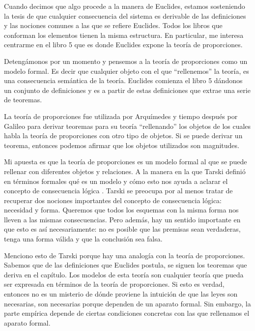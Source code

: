 Cuando decimos que algo procede a la manera de Euclides, estamos sosteniendo la tesis de que cualquier consecuencia del sistema es derivable de las definiciones y las nociones comunes a las que se refiere Euclides. Todos los libros que conforman los elementos tienen la misma estructura. En particular, me interesa centrarme en el libro 5 que es donde Euclides expone la teoría de proporciones.

Detengámonos por un momento y pensemos a la teoría de proporciones como un modelo formal. Es decir que cualquier objeto con el que ``rellenemos'' la teoría, es una consecuencia semántica%
de la teoría. Euclides comienza el libro 5 dándonos un conjunto de definiciones y es a partir de estas definiciones que extrae una serie de teoremas.

La teoría de proporciones fue utilizada por Arquímedes y tiempo después por Galileo para derivar teoremas para su teoría ``rellenando'' los objetos de los cuales habla la teoría de proporciones con otro tipo de objetos. Si se puede derivar un teorema, entonces podemos afirmar que los objetos utilizados son magnitudes.

Mi apuesta es que la teoría de proporciones es un modelo formal al que se puede rellenar con diferentes objetos y relaciones. A la manera en la que Tarski definió en términos formales qué es un modelo y cómo esto nos ayuda a aclarar el concepto de consecuencia lógica \cite{Tarski1956}. Tarski se preocupa por al menos tratar de recuperar dos nociones importantes del concepto de consecuencia lógica: necesidad y forma. \cite{Torrente2000} Queremos que todos los esquemas con la misma forma nos lleven a las mismas consecuencias. Pero además, hay un sentido importante en que esto es así necesariamente: no es posible que las premisas sean verdaderas, tenga una forma válida y que la conclusión sea falsa.

Menciono esto de Tarski porque hay una analogía con la teoría de proporciones. Sabemos que de las definiciones que Euclides postula, se siguen los teoremas que deriva en el capítulo. Los modelos de esta teoría son cualquier teoría que pueda ser expresada en términos de la teoría de proporciones. Si esto es verdad, entonces no es un misterio de dónde proviene la intuición de que las leyes son necesarias, son necesarias porque dependen de un aparato formal. Sin embargo, la parte empírica depende de ciertas condiciones concretas con las que rellenamos el aparato formal.

